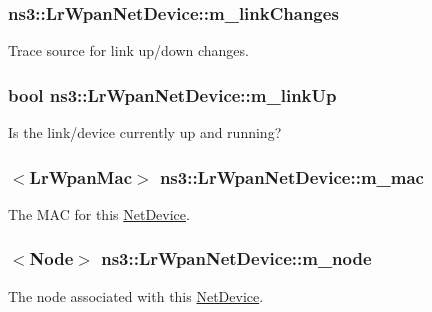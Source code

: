 \subsubsection[{\texorpdfstring{m\+\_\+link\+Changes}{m_linkChanges}}]{ ns3\+::\+Lr\+Wpan\+Net\+Device\+::m\+\_\+link\+Changes\hspace{0.3cm}{\ttfamily [private]}}\hypertarget{classns3_1_1LrWpanNetDevice_adfd54c10aeb7b1f878242a2eda1ca813}{}\label{classns3_1_1LrWpanNetDevice_adfd54c10aeb7b1f878242a2eda1ca813}
Trace source for link up/down changes. 
\subsubsection[{\texorpdfstring{m\+\_\+link\+Up}{m_linkUp}}]{\setlength{\rightskip}{0pt plus 5cm}bool ns3\+::\+Lr\+Wpan\+Net\+Device\+::m\+\_\+link\+Up\hspace{0.3cm}{\ttfamily [private]}}\hypertarget{classns3_1_1LrWpanNetDevice_a67d9d8e2d43301ff6b8b0001488613ea}{}\label{classns3_1_1LrWpanNetDevice_a67d9d8e2d43301ff6b8b0001488613ea}
Is the link/device currently up and running? 
\subsubsection[{\texorpdfstring{m\+\_\+mac}{m_mac}}]{$<${\bf Lr\+Wpan\+Mac}$>$ ns3\+::\+Lr\+Wpan\+Net\+Device\+::m\+\_\+mac\hspace{0.3cm}{\ttfamily [private]}}\hypertarget{classns3_1_1LrWpanNetDevice_a2592ad53fd745035dfdd50ffeb4e4259}{}\label{classns3_1_1LrWpanNetDevice_a2592ad53fd745035dfdd50ffeb4e4259}
The M\+AC for this \hyperlink{classns3_1_1NetDevice}{Net\+Device}. 
\subsubsection[{\texorpdfstring{m\+\_\+node}{m_node}}]{$<${\bf Node}$>$ ns3\+::\+Lr\+Wpan\+Net\+Device\+::m\+\_\+node\hspace{0.3cm}{\ttfamily [private]}}\hypertarget{classns3_1_1LrWpanNetDevice_a519ec8c18dffe783cbd0d8a8dbf31e99}{}\label{classns3_1_1LrWpanNetDevice_a519ec8c18dffe783cbd0d8a8dbf31e99}
The node associated with this \hyperlink{classns3_1_1NetDevice}{Net\+Device}. 
